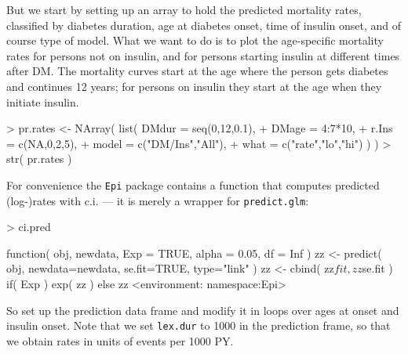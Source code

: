 \documentclass[a4paper,twoside,12pt]{report}
\begin{document}
But we start by setting up an array to hold the predicted mortality
rates, classified by diabetes duration, age at diabetes onset, time of
insulin onset, and of course type of model. What we want to do is to
plot the age-specific mortality rates for persons not on insulin, and
for persons starting insulin at different times after DM. The
mortality curves start at the age where the person gets diabetes and
continues 12 years; for persons on insulin they start at the age when
they initiate insulin.
\begin{Schunk}
\begin{Sinput}
> pr.rates <- NArray( list( DMdur = seq(0,12,0.1),
+                           DMage = 4:7*10,
+                           r.Ins = c(NA,0,2,5),
+                           model = c("DM/Ins","All"),
+                            what = c("rate","lo","hi") ) )
> str( pr.rates )
\end{Sinput}
\end{Schunk}
For convenience the \texttt{Epi} package contains a function that computes
predicted (log-)rates with c.i. --- it is merely a wrapper for
\texttt{predict.glm}:
\begin{Schunk}
\begin{Sinput}
> ci.pred
\end{Sinput}
\begin{Soutput}
function( obj, newdata,
         Exp = TRUE,
       alpha = 0.05,
          df = Inf )
{
zz <- predict( obj, newdata=newdata, se.fit=TRUE, type="link" )
zz <- cbind( zz$fit, zz$se.fit ) %*% ci.mat( alpha=alpha, df=df )
if( Exp ) exp( zz ) else zz
}
<environment: namespace:Epi>
\end{Soutput}
\end{Schunk}
So set up the prediction data frame and modify it in loops over
ages at onset and insulin onset. Note that we set \texttt{lex.dur} to
1000 in the prediction frame, so that we obtain rates in units of
events per 1000 PY.
\end{document}
